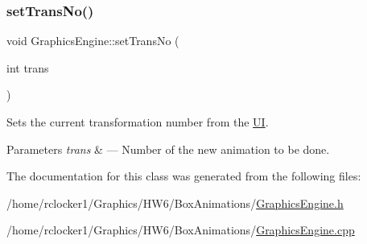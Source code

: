 \subsubsection{\texorpdfstring{set\+Trans\+No()}{setTransNo()}}
{\footnotesize\ttfamily void Graphics\+Engine\+::set\+Trans\+No (\begin{DoxyParamCaption}\item[{int}]{trans }\end{DoxyParamCaption})}



Sets the current transformation number from the \hyperlink{class_u_i}{UI}. 


\begin{DoxyParams}{Parameters}
{\em trans} & --- Number of the new animation to be done. \\
\hline
\end{DoxyParams}


The documentation for this class was generated from the following files\+:\begin{DoxyCompactItemize}
\item 
/home/rclocker1/\+Graphics/\+H\+W6/\+Box\+Animations/\hyperlink{_graphics_engine_8h}{Graphics\+Engine.\+h}\item 
/home/rclocker1/\+Graphics/\+H\+W6/\+Box\+Animations/\hyperlink{_graphics_engine_8cpp}{Graphics\+Engine.\+cpp}\end{DoxyCompactItemize}
